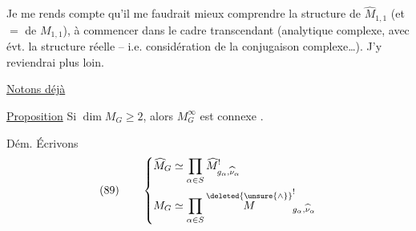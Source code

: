 Je me rends compte qu'il me faudrait mieux comprendre la structure de $\widehat M_{1,1}$ (et $=$ de $M_{1,1}$), à commencer dans le cadre transcendant (analytique complexe, avec évt. la structure réelle  -- i.e. considération de la conjugaison complexe\ldots). J'y reviendrai plus loin.

\uline{Notons déjà}

\uline{Proposition} Si $\dim M_G\geq2$, alors $M_G^\infty$ est  connexe .

Dém. Écrivons
\[
(89)\qquad\left\{\begin{aligned}
\widehat M_G&\simeq\prod_{\alpha\in S}\widehat M^{!}_{g_\alpha,\widehat\nu_\alpha}\\
M_G&\simeq\prod_{\alpha\in S}\overset{\deleted{\unsure{\wedge}}}{M}^{!}_{g_\alpha,\widehat\nu_\alpha}
\end{aligned}\right.
\]

